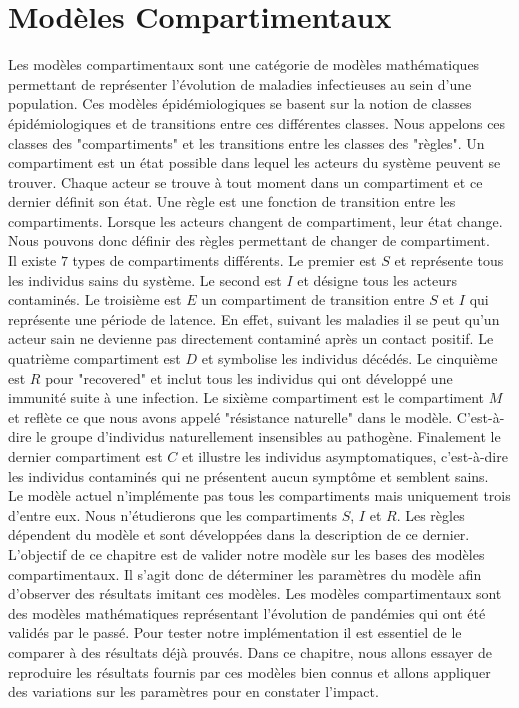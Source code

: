 \chapter{Modèles Compartimentaux} \label{ch:intro}

Les modèles compartimentaux sont une catégorie de modèles mathématiques permettant de représenter l'évolution de maladies infectieuses au sein d'une population. Ces modèles épidémiologiques se basent sur la notion de classes épidémiologiques et de transitions entre ces différentes classes. Nous appelons ces classes des "compartiments" et les transitions entre les classes des "règles". Un compartiment est un état possible dans lequel les acteurs du système peuvent se trouver. Chaque acteur se trouve à tout moment dans un compartiment et ce dernier définit son état. Une règle est une fonction de transition entre les compartiments. Lorsque les acteurs changent de compartiment, leur état change. Nous pouvons donc définir des règles permettant de changer de compartiment.\\

Il existe $7$ types de compartiments différents. Le premier est $S$ et représente tous les individus sains du système. Le second est $I$ et désigne tous les acteurs contaminés. Le troisième est $E$ un compartiment de transition entre $S$ et $I$ qui représente une période de latence. En effet, suivant les maladies il se peut qu'un acteur sain ne devienne pas directement contaminé après un contact positif. Le quatrième compartiment est $D$ et symbolise les individus décédés. Le cinquième est $R$ pour "recovered" et inclut tous les individus qui ont développé une immunité suite à une infection. Le sixième compartiment est le compartiment $M$ et reflète ce que nous avons appelé "résistance naturelle" dans le modèle. C'est-à-dire le groupe d'individus naturellement insensibles au pathogène. Finalement le dernier compartiment est $C$ et illustre les individus asymptomatiques, c'est-à-dire les individus contaminés qui ne présentent aucun symptôme et semblent sains.\\

Le modèle actuel n'implémente pas tous les compartiments mais uniquement trois d'entre eux. Nous n'étudierons que les compartiments $S$, $I$ et $R$. Les règles dépendent du modèle et sont développées dans la description de ce dernier.\\

L'objectif de ce chapitre est de valider notre modèle sur les bases des modèles compartimentaux. Il s'agit donc de déterminer les paramètres du modèle afin d'observer des résultats imitant ces modèles. Les modèles compartimentaux sont des modèles mathématiques représentant l'évolution de pandémies qui ont été validés par le passé. Pour tester notre implémentation il est essentiel de le comparer à des résultats déjà prouvés. Dans ce chapitre, nous allons essayer de reproduire les résultats fournis par ces modèles bien connus et allons appliquer des variations sur les paramètres pour en constater l'impact.\\

